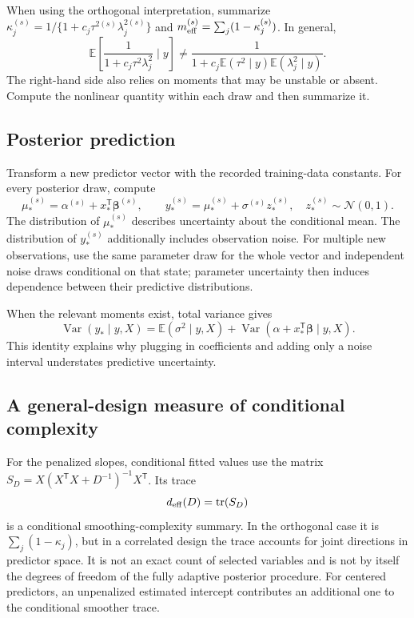 \documentclass[11pt,letterpaper]{article}
\numberwithin{equation}{section}
\newcommand{\E}{\mathbb{E}}
\newcommand{\Var}{\operatorname{Var}}
\newcommand{\tr}{\operatorname{tr}}
\newcommand{\Normal}{\mathcal{N}}
\newcommand{\given}{\mid}
\newcommand{\bbeta}{\bm{\beta}}
\newcommand{\trans}{^{\mathsf T}}
\begin{document}
When using the orthogonal interpretation, summarize
\(\kappa_j^{(s)}=1/\{1+c_j\tau^{2(s)}\lambda_j^{2(s)}\}\) and
\(m_{\rm eff}^{(s)}=\sum_j(1-\kappa_j^{(s)})\). In general,
\[
 \E\left[\frac1{1+c_j\tau^2\lambda_j^2}\given y\right]
 \ne \frac1{1+c_j\E(\tau^2\given y)\E(\lambda_j^2\given y)}.
\]
The right-hand side also relies on moments that may be unstable or absent.
Compute the nonlinear quantity within each draw and then summarize it.

\subsection{Posterior prediction}

Transform a new predictor vector with the recorded training-data constants.
For every posterior draw, compute
\begin{equation}
 \mu_*^{(s)}=\alpha^{(s)}+x_*\trans\bbeta^{(s)},\qquad
 y_*^{(s)}=\mu_*^{(s)}+\sigma^{(s)}z_*^{(s)},\quad
 z_*^{(s)}\sim\Normal(0,1).
\end{equation}
The distribution of \(\mu_*^{(s)}\) describes uncertainty about the conditional
mean. The distribution of \(y_*^{(s)}\) additionally includes observation
noise. For multiple new observations, use the same parameter draw for the
whole vector and independent noise draws conditional on that state; parameter
uncertainty then induces dependence between their predictive distributions.

When the relevant moments exist, total variance gives
\begin{equation}
 \Var(y_*\given y,X)=\E(\sigma^2\given y,X)
       +\Var(\alpha+x_*\trans\bbeta\given y,X).
\end{equation}
This identity explains why plugging in coefficients and adding only a noise
interval understates predictive uncertainty.

\subsection{A general-design measure of conditional complexity}

For the penalized slopes, conditional fitted values use the matrix
\(S_D=X(X\trans X+D^{-1})^{-1}X\trans\). Its trace
\begin{equation}
 d_{\rm eff}(D)=\tr(S_D)
\end{equation}
is a conditional smoothing-complexity summary. In the orthogonal case it is
\(\sum_j(1-\kappa_j)\), but in a correlated design the trace accounts for
joint directions in predictor space. It is not an exact count of selected
variables and is not by itself the degrees of freedom of the fully adaptive
posterior procedure. For centered predictors, an unpenalized estimated
intercept contributes an additional one to the conditional smoother trace.
\end{document}
